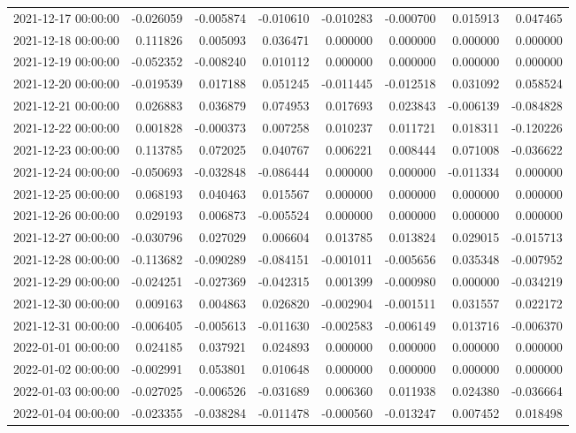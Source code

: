 \begin{tabular}{lrrrrrrr}
2021-12-17 00:00:00 & -0.026059 & -0.005874 & -0.010610 & -0.010283 & -0.000700 & 0.015913 & 0.047465 \\
2021-12-18 00:00:00 & 0.111826 & 0.005093 & 0.036471 & 0.000000 & 0.000000 & 0.000000 & 0.000000 \\
2021-12-19 00:00:00 & -0.052352 & -0.008240 & 0.010112 & 0.000000 & 0.000000 & 0.000000 & 0.000000 \\
2021-12-20 00:00:00 & -0.019539 & 0.017188 & 0.051245 & -0.011445 & -0.012518 & 0.031092 & 0.058524 \\
2021-12-21 00:00:00 & 0.026883 & 0.036879 & 0.074953 & 0.017693 & 0.023843 & -0.006139 & -0.084828 \\
2021-12-22 00:00:00 & 0.001828 & -0.000373 & 0.007258 & 0.010237 & 0.011721 & 0.018311 & -0.120226 \\
2021-12-23 00:00:00 & 0.113785 & 0.072025 & 0.040767 & 0.006221 & 0.008444 & 0.071008 & -0.036622 \\
2021-12-24 00:00:00 & -0.050693 & -0.032848 & -0.086444 & 0.000000 & 0.000000 & -0.011334 & 0.000000 \\
2021-12-25 00:00:00 & 0.068193 & 0.040463 & 0.015567 & 0.000000 & 0.000000 & 0.000000 & 0.000000 \\
2021-12-26 00:00:00 & 0.029193 & 0.006873 & -0.005524 & 0.000000 & 0.000000 & 0.000000 & 0.000000 \\
2021-12-27 00:00:00 & -0.030796 & 0.027029 & 0.006604 & 0.013785 & 0.013824 & 0.029015 & -0.015713 \\
2021-12-28 00:00:00 & -0.113682 & -0.090289 & -0.084151 & -0.001011 & -0.005656 & 0.035348 & -0.007952 \\
2021-12-29 00:00:00 & -0.024251 & -0.027369 & -0.042315 & 0.001399 & -0.000980 & 0.000000 & -0.034219 \\
2021-12-30 00:00:00 & 0.009163 & 0.004863 & 0.026820 & -0.002904 & -0.001511 & 0.031557 & 0.022172 \\
2021-12-31 00:00:00 & -0.006405 & -0.005613 & -0.011630 & -0.002583 & -0.006149 & 0.013716 & -0.006370 \\
2022-01-01 00:00:00 & 0.024185 & 0.037921 & 0.024893 & 0.000000 & 0.000000 & 0.000000 & 0.000000 \\
2022-01-02 00:00:00 & -0.002991 & 0.053801 & 0.010648 & 0.000000 & 0.000000 & 0.000000 & 0.000000 \\
2022-01-03 00:00:00 & -0.027025 & -0.006526 & -0.031689 & 0.006360 & 0.011938 & 0.024380 & -0.036664 \\
2022-01-04 00:00:00 & -0.023355 & -0.038284 & -0.011478 & -0.000560 & -0.013247 & 0.007452 & 0.018498 \\

\end{tabular}
